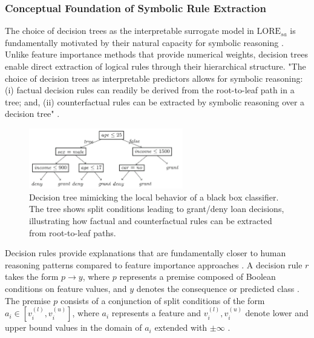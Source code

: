 \subsubsection{Conceptual Foundation of Symbolic Rule Extraction}

The choice of decision trees as the interpretable surrogate model in $\text{LORE}_{sa}$ is fundamentally motivated by their natural capacity for symbolic reasoning \cite{guidotti2022stable}. Unlike feature importance methods that provide numerical weights, decision trees enable direct extraction of logical rules through their hierarchical structure. "The choice of decision trees as interpretable predictors allows for symbolic reasoning: (i) factual decision rules can readily be derived from the root-to-leaf path in a tree; and, (ii) counterfactual rules can be extracted by symbolic reasoning over a decision tree" \cite{guidotti2022stable, Breiman1984ClassificationAR, 10.1609/aaai.v33i01.330110035}.

\begin{figure}[ht]
\centering
\includegraphics[width=0.6\textwidth]{images/decision tree example lore_sa.png}
\caption{Decision tree mimicking the local behavior of a black box classifier. The tree shows split conditions leading to grant/deny loan decisions, illustrating how factual and counterfactual rules can be extracted from root-to-leaf paths.}
\label{fig:decision_tree_example}
\end{figure}

Decision rules provide explanations that are fundamentally closer to human reasoning patterns compared to feature importance approaches \cite{bodria2023benchmarking}. A decision rule $r$ takes the form $p \rightarrow y$, where $p$ represents a premise composed of Boolean conditions on feature values, and $y$ denotes the consequence or predicted class \cite{guidotti2022stable}. The premise $p$ consists of a conjunction of split conditions of the form $a_i \in [v_i^{(l)}, v_i^{(u)}]$, where $a_i$ represents a feature and $v_i^{(l)}, v_i^{(u)}$ denote lower and upper bound values in the domain of $a_i$ extended with $\pm\infty$ \cite{guidotti2022stable}.

